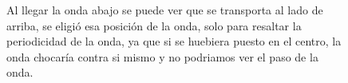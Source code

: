 \documentclass[12pt,a4paper]{book}
\begin{document}
\begin{figure}[H]
\centering
{}
\caption{Al llegar la onda abajo se puede ver que se transporta al lado de arriba, se eligió esa posición de la onda, solo para resaltar la periodicidad de la onda, ya que si se huebiera puesto en el centro, la onda chocaría contra si mismo y no podriamos ver el paso de la onda.} \label{fig:periodicas}
\end{figure}
\end{document}
